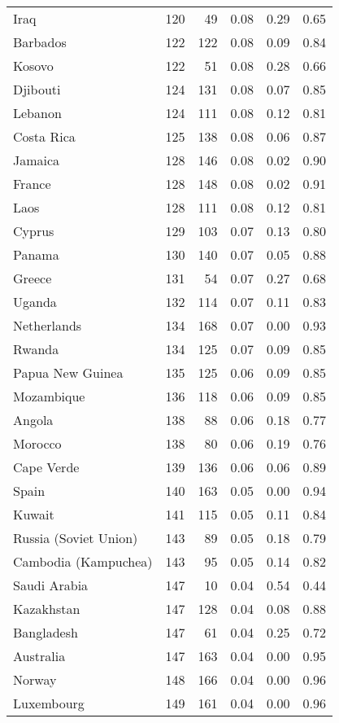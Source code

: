 \begin{longtable}[t]{lrrrrr}
Iraq & 120 & 49 & 0.08 & 0.29 & 0.65\\
\addlinespace
Barbados & 122 & 122 & 0.08 & 0.09 & 0.84\\
Kosovo & 122 & 51 & 0.08 & 0.28 & 0.66\\
Djibouti & 124 & 131 & 0.08 & 0.07 & 0.85\\
Lebanon & 124 & 111 & 0.08 & 0.12 & 0.81\\
Costa Rica & 125 & 138 & 0.08 & 0.06 & 0.87\\
\addlinespace
Jamaica & 128 & 146 & 0.08 & 0.02 & 0.90\\
France & 128 & 148 & 0.08 & 0.02 & 0.91\\
Laos & 128 & 111 & 0.08 & 0.12 & 0.81\\
Cyprus & 129 & 103 & 0.07 & 0.13 & 0.80\\
Panama & 130 & 140 & 0.07 & 0.05 & 0.88\\
\addlinespace
Greece & 131 & 54 & 0.07 & 0.27 & 0.68\\
Uganda & 132 & 114 & 0.07 & 0.11 & 0.83\\
Netherlands & 134 & 168 & 0.07 & 0.00 & 0.93\\
Rwanda & 134 & 125 & 0.07 & 0.09 & 0.85\\
Papua New Guinea & 135 & 125 & 0.06 & 0.09 & 0.85\\
\addlinespace
Mozambique & 136 & 118 & 0.06 & 0.09 & 0.85\\
Angola & 138 & 88 & 0.06 & 0.18 & 0.77\\
Morocco & 138 & 80 & 0.06 & 0.19 & 0.76\\
Cape Verde & 139 & 136 & 0.06 & 0.06 & 0.89\\
Spain & 140 & 163 & 0.05 & 0.00 & 0.94\\
\addlinespace
Kuwait & 141 & 115 & 0.05 & 0.11 & 0.84\\
Russia (Soviet Union) & 143 & 89 & 0.05 & 0.18 & 0.79\\
Cambodia (Kampuchea) & 143 & 95 & 0.05 & 0.14 & 0.82\\
Saudi Arabia & 147 & 10 & 0.04 & 0.54 & 0.44\\
Kazakhstan & 147 & 128 & 0.04 & 0.08 & 0.88\\
\addlinespace
Bangladesh & 147 & 61 & 0.04 & 0.25 & 0.72\\
Australia & 147 & 163 & 0.04 & 0.00 & 0.95\\
Norway & 148 & 166 & 0.04 & 0.00 & 0.96\\
Luxembourg & 149 & 161 & 0.04 & 0.00 & 0.96\\

\end{longtable}
